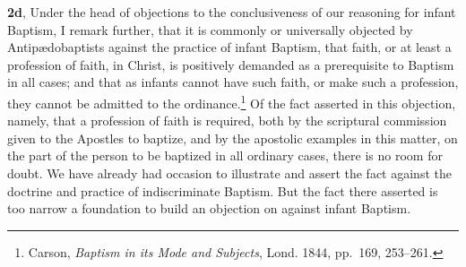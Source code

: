 \documentclass[
]{book}
\begin{document}
\textbf{2d}, Under the head of objections to the conclusiveness of our reasoning for infant Baptism, I remark further, that it is commonly or universally objected by Antipædobaptists against the practice of infant Baptism, that faith, or at least a profession of faith, in Christ, is positively demanded as a prerequisite to Baptism in all cases; and that as infants cannot have such faith, or make such a profession, they cannot be admitted to the ordinance.\footnote{Carson, \emph{Baptism in its Mode and Subjects}, Lond. 1844, pp.~169, 253--261.} Of the fact asserted in this objection, namely, that a profession of faith is required, both by the scriptural commission given to the Apostles to baptize, and by the apostolic examples in this matter, on the part of the person to be baptized in all ordinary cases, there is no room for doubt. We have already had occasion to illustrate and assert the fact against the doctrine and practice of indiscriminate Baptism. But the fact there asserted is too narrow a foundation to build an objection on against infant Baptism.
\end{document}
